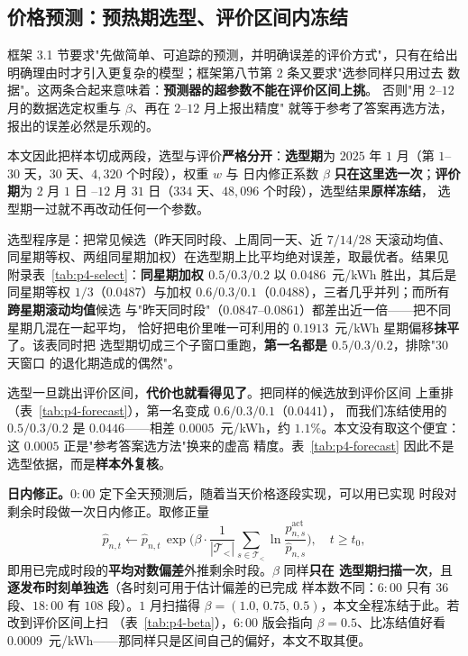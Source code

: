 \subsection{价格预测：预热期选型、评价区间内冻结}
\label{sec:p4-forecast}

框架 3.1 节要求"先做简单、可追踪的预测，并明确误差的评价方式"，只有在给出
明确理由时才引入更复杂的模型；框架第八节第 2 条又要求"选参同样只用过去
数据"。这两条合起来意味着：\textbf{预测器的超参数不能在评价区间上挑}。
否则"用 $2$--$12$ 月的数据选定权重与 $\beta$、再在 $2$--$12$ 月上报出精度"
就等于参考了答案再选方法，报出的误差必然是乐观的。

本文因此把样本切成两段，选型与评价\textbf{严格分开}：\textbf{选型期}为
$2025$ 年 $1$ 月（第 $1$--$30$ 天，$30$ 天、$4{,}320$ 个时段），权重 $w$ 与
日内修正系数 $\beta$ \textbf{只在这里选一次}；\textbf{评价期}为 $2$ 月 $1$ 日
--$12$ 月 $31$ 日（$334$ 天、$48{,}096$ 个时段），选型结果\textbf{原样冻结}，
选型期一过就不再改动任何一个参数。

选型程序是：把常见候选（昨天同时段、上周同一天、近 $7/14/28$ 天滚动均值、
同星期等权、两组同星期加权）在选型期上比平均绝对误差，取最优者。结果见
附录表~\ref{tab:p4-select}：\textbf{同星期加权 $0.5/0.3/0.2$} 以
$0.0486$~元/kWh 胜出，其后是同星期等权 $1/3$（$0.0487$）与加权
$0.6/0.3/0.1$（$0.0488$），三者几乎并列；而所有\textbf{跨星期滚动均值}候选
与"昨天同时段"（$0.0847$--$0.0861$）都差出近一倍——把不同星期几混在一起平均，
恰好把电价里唯一可利用的 $0.1913$~元/kWh 星期偏移\textbf{抹平}了。该表同时把
选型期切成三个子窗口重跑，\textbf{第一名都是 $0.5/0.3/0.2$}，排除"$30$ 天窗口
的退化期造成的偶然"。

选型一旦跳出评价区间，\textbf{代价也就看得见了}。把同样的候选放到评价区间
上重排（表~\ref{tab:p4-forecast}），第一名变成 $0.6/0.3/0.1$（$0.0441$），
而我们冻结使用的 $0.5/0.3/0.2$ 是 $0.0446$——相差 $0.0005$~元/kWh，约
$1.1\%$。本文没有取这个便宜：这 $0.0005$ 正是"参考答案选方法"换来的虚高
精度。表~\ref{tab:p4-forecast} 因此不是选型依据，而是\textbf{样本外复核}。

\textbf{日内修正。}$0{:}00$ 定下全天预测后，随着当天价格逐段实现，可以用已实现
时段对剩余时段做一次日内修正。取修正量
$$
\widehat p_{n,t}\leftarrow\widehat p_{n,t}\,
\exp\!\Big(\beta\cdot\frac{1}{|\mathcal T_{<}|}\sum_{s\in\mathcal T_{<}}
\ln\frac{p_{n,s}^{\mathrm{act}}}{\widehat p_{n,s}}\Big),\quad t\ge t_0,
$$
即用已完成时段的\textbf{平均对数偏差}外推剩余时段。$\beta$ 同样\textbf{只在
选型期扫描一次}，且\textbf{逐发布时刻单独选}（各时刻可用于估计偏差的已完成
样本数不同：$6{:}00$ 只有 $36$ 段、$18{:}00$ 有 $108$ 段）。$1$ 月扫描得
$\beta=(1.0,\,0.75,\,0.5)$，本文全程冻结于此。若改到评价区间上扫
（表~\ref{tab:p4-beta}），$6{:}00$ 版会指向 $\beta=0.5$、比冻结值好看
$0.0009$~元/kWh——那同样只是区间自己的偏好，本文不取其便。

